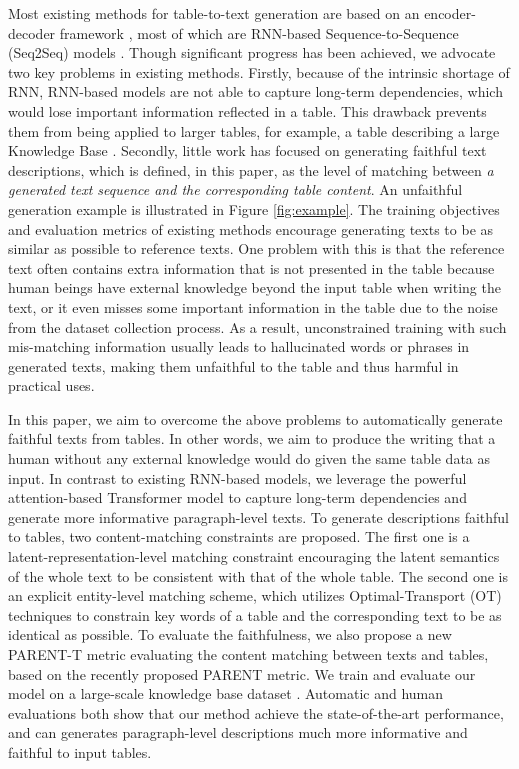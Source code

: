 \documentclass[11pt,a4paper]{article}
\begin{document}
Most existing methods for table-to-text generation are based on an encoder-decoder
framework \cite{Sutskever2014,Bahdanau2015}, most of which are RNN-based Sequence-to-Sequence (Seq2Seq) models \cite{Wikiemnlp2016,structure2018,Wiseman2018,Ma2019,Wang2018,tianyu2019}. 
Though significant progress has been achieved, we advocate two key problems in existing methods. 
Firstly, because of the intrinsic shortage of RNN, RNN-based models are not able to capture long-term dependencies, 
which would lose important information reflected in a table. 
This drawback prevents them from being applied to larger tables, for example, a table describing a large Knowledge Base \cite{Wang2018}. Secondly, little work has focused on generating faithful text descriptions, which is defined, in this paper, as the level of matching between \textit{a generated text sequence and the corresponding table content}. An unfaithful generation example is illustrated in Figure \ref{fig:example}. The training objectives and evaluation metrics of existing methods encourage generating texts to be as similar as possible to reference texts. One problem with this is that the reference text often contains extra information that is not presented in the table because human beings have external knowledge beyond the input table when writing the text, or it even misses some important information in the table \cite{Dhingra2019} due to the noise from the dataset collection process. As a result, unconstrained training with such mis-matching information usually leads to hallucinated words or phrases in generated texts, making them unfaithful to the table and thus harmful in practical uses. 


In this paper, we aim to overcome the above problems to automatically generate faithful texts from tables. In other words, we aim to produce the writing that a human without any external knowledge would do given the same table data as input.
In contrast to existing RNN-based models, we leverage the powerful attention-based Transformer model to capture long-term dependencies and generate more informative paragraph-level texts.
To generate descriptions faithful to tables, two content-matching constraints are proposed. 
The first one is a latent-representation-level matching constraint encouraging the latent semantics of the whole text to be consistent with that of the whole table. 
The second one is an explicit entity-level matching scheme, which utilizes Optimal-Transport (OT) techniques to constrain key words of a table and the corresponding text to be as identical as possible. 
To evaluate the faithfulness, we also propose a new PARENT-T metric evaluating the content matching between texts and tables, based on the recently proposed PARENT \cite{Dhingra2019} metric. 
We train and evaluate our model on a large-scale knowledge base dataset \cite{Wang2018}. 
Automatic and human evaluations both show that our method achieve the state-of-the-art performance, and can generates paragraph-level descriptions much more informative and faithful to input tables.
\end{document}
